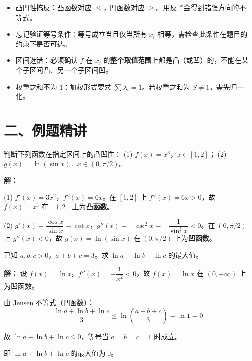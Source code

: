 \documentclass[12pt, a4paper]{ctexart}
\begin{document}
\begin{warnbox}
\begin{itemize}
  \item 凸凹性搞反：凸函数对应 $\leq$，凹函数对应 $\geq$。用反了会得到错误方向的不等式。
  \item 忘记验证等号条件：等号成立当且仅当所有 $x_i$ 相等，需检查此条件在题目的约束下是否可达。
  \item 区间选错：必须确认 $f$ 在 $x_i$ 的\textbf{整个取值范围}上都是凸（或凹）的，不能在某个子区间凸、另一个子区间凹。
  \item 权重之和不为 $1$：加权形式要求 $\sum \lambda_i = 1$。若权重之和为 $S \neq 1$，需先归一化。
\end{itemize}
\end{warnbox}

\section*{\textcolor{examorange}{二、例题精讲}}

\begin{examplebox}[【例题1】基本凸凹性判断]
判断下列函数在指定区间上的凸凹性：
(1) $f(x) = x^3$，$x \in [1, 2]$；\quad
(2) $g(x) = \ln(\sin x)$，$x \in (0, \pi/2)$。
\end{examplebox}

\textbf{解：}

(1) $f'(x) = 3x^2$，$f''(x) = 6x$。在 $[1, 2]$ 上 $f''(x) = 6x > 0$，故 $f(x) = x^3$ 在 $[1, 2]$ 上为\textbf{凸函数}。

(2) $g'(x) = \dfrac{\cos x}{\sin x} = \cot x$，$g''(x) = -\csc^2 x = -\dfrac{1}{\sin^2 x} < 0$。在 $(0, \pi/2)$ 上 $g''(x) < 0$，故 $g(x) = \ln(\sin x)$ 在 $(0, \pi/2)$ 上为\textbf{凹函数}。

\begin{examplebox}
已知 $a, b, c > 0$，$a + b + c = 3$。求 $\ln a + \ln b + \ln c$ 的最大值。
\end{examplebox}

\textbf{解：} 设 $f(x) = \ln x$，$f''(x) = -\dfrac{1}{x^2} < 0$，故 $f(x) = \ln x$ 在 $(0, +\infty)$ 上为凹函数。

由 Jensen 不等式（凹函数）：
$$\frac{\ln a + \ln b + \ln c}{3} \leq \ln\!\left(\frac{a + b + c}{3}\right) = \ln 1 = 0$$

故 $\ln a + \ln b + \ln c \leq 0$，等号当 $a = b = c = 1$ 时成立。

即 $\ln a + \ln b + \ln c$ 的最大值为 $\boxed{0}$。
\end{document}
